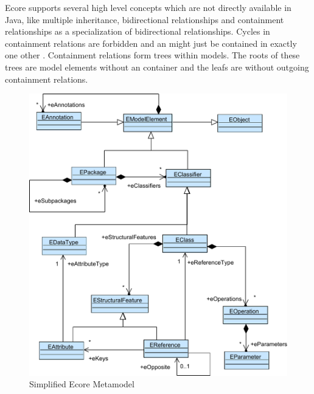Ecore supports several high level concepts which are not directly available in Java, like multiple inheritance, bidirectional relationships and containment relationships as a specialization of bidirectional relationships. Cycles in containment relations are forbidden and an  might just be contained in exactly one other . Containment relations form trees within models. The roots of these trees are model elements without an container  and the leafs are  without outgoing containment relations.  

\begin{figure}
\centering
\includegraphics[scale=0.9]{gfx/ex/Ecore} 
\caption{Simplified Ecore Metamodel}
\label{MM:Ecore}
\end{figure}
	
